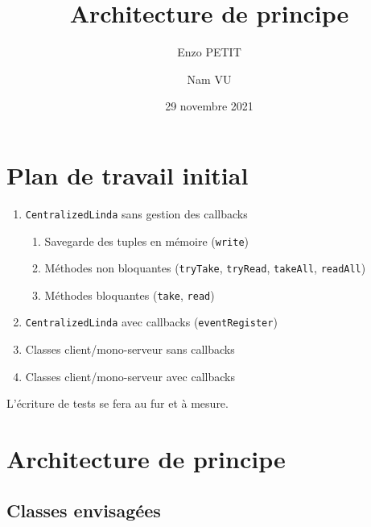 \documentclass[headings=standardclasses,parskip=half]{scrartcl}
\title{Architecture de principe}
\subtitle{}
\author{Enzo PETIT \and Nam VU}
\date{29 novembre 2021}
\begin{document}
\maketitle

% 

\section*{Plan de travail initial}

\begin{enumerate}
    \item \texttt{CentralizedLinda} sans gestion des callbacks
          \begin{enumerate}
              \item Savegarde des tuples en mémoire (\texttt{write})
              \item Méthodes non bloquantes (\texttt{tryTake}, \texttt{tryRead}, \texttt{takeAll}, \texttt{readAll})
              \item Méthodes bloquantes (\texttt{take}, \texttt{read})
          \end{enumerate}
    \item \texttt{CentralizedLinda} avec callbacks (\texttt{eventRegister})
    \item Classes client/mono-serveur sans callbacks
    \item Classes client/mono-serveur avec callbacks
\end{enumerate}

L'écriture de tests se fera au fur et à mesure.

\section*{Architecture de principe}

\subsection*{Classes envisagées}
\end{document}
